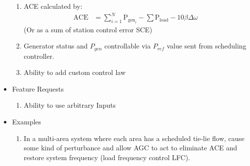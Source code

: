 \documentclass[12pt]{article}
\newcommand{\pgen}[1]{\ensuremath{\text{P}_{\text{gen}_{#1}}}}
\newcommand{\pload}{\ensuremath{\text{P}_{\text{load}}}}
\begin{document}
\begin{multicols*}{2}
\begin{itemize}
	\begin{enumerate}
		\item ACE calculated by:
\begin{align*}
\text{ACE} &= \sum_{i=1}^{N}\pgen{i} - \sum \pload -10 \beta \Delta\omega
\end{align*}
(Or as a sum of station control error SCE)
		\item  Generator status and $P_{gen}$ controllable via $P_{ref}$ value sent from scheduling controller.
		\item Ability to add custom control law
	\end{enumerate}
	\item Feature Requests
	\begin{enumerate}
		\item Ability to use arbitrary Inputs
	\end{enumerate}
	\item Examples
	\begin{enumerate}
	\item In a multi-area system where each area has a scheduled tie-lie flow, cause some kind of perturbance and allow AGC to act to eliminate ACE and restore system frequency (load frequency control LFC).
	\end{enumerate}	
\end{itemize}
\vfill\null
\end{multicols*}
\end{document}

